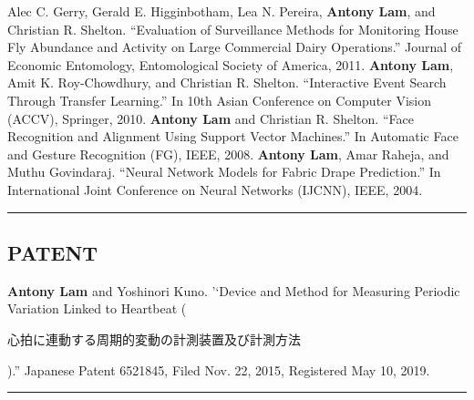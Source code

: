 \documentclass[letterpaper,10pt]{article}
\newcommand{\myline}{ \rule{\textwidth}{0.01in} }
\begin{document}
\vspace{0.05in}\newline
Alec C. Gerry, Gerald E. Higginbotham, Lea N. Pereira, \textbf{Antony Lam}, and Christian R. Shelton. ``Evaluation of Surveillance Methods for Monitoring House Fly Abundance and Activity on Large Commercial Dairy Operations.'' Journal of Economic Entomology, Entomological Society of America, 2011.
\vspace{0.05in}\newline\newline\newline
\textbf{Antony Lam}, Amit K. Roy-Chowdhury, and Christian R. Shelton. ``Interactive Event Search Through Transfer Learning.'' In 10th Asian Conference on Computer Vision (ACCV), Springer, 2010.
\vspace{0.05in}\newline
\textbf{Antony Lam} and Christian R. Shelton. ``Face Recognition and Alignment Using Support Vector Machines.'' In Automatic Face and Gesture Recognition (FG), IEEE, 2008.
\vspace{0.05in}\newline
\textbf{Antony Lam}, Amar Raheja, and Muthu Govindaraj. ``Neural Network Models for Fabric Drape Prediction.'' In International Joint Conference on Neural Networks (IJCNN), IEEE, 2004.
\myline
\subsection*{PATENT}
\textbf{Antony Lam} and Yoshinori Kuno. '`Device and Method for Measuring
Periodic Variation Linked to Heartbeat ({\begin{CJK}{UTF8}{min}\begin{small}心拍に連動する周期的変動の計測装置及び計測方法\end{small}\end{CJK}}).''
Japanese Patent 6521845, Filed Nov. 22, 2015, Registered May 10, 2019. 
\myline
\end{document}
